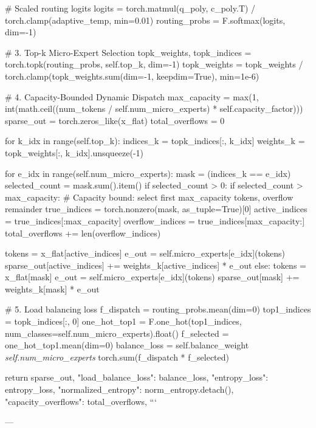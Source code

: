 \documentclass[11pt,twoside,openright]{amsbook}
\begin{document}
{{{{{{{{{{    # Scaled routing logits
    logits = torch.matmul(q_poly, c_poly.T) / torch.clamp(adaptive_temp, min=0.01)
    routing_probs = F.softmax(logits, dim=-1)

    # 3. Top-k Micro-Expert Selection
    topk_weights, topk_indices = torch.topk(routing_probs, self.top_k, dim=-1)
    topk_weights = topk_weights / torch.clamp(topk_weights.sum(dim=-1, keepdim=True), min=1e-6)

    # 4. Capacity-Bounded Dynamic Dispatch
    max_capacity = max(1, int(math.ceil((num_tokens / self.num_micro_experts) * self.capacity_factor)))
    sparse_out = torch.zeros_like(x_flat)
    total_overflows = 0

    for k_idx in range(self.top_k):
        indices_k = topk_indices[:, k_idx]
        weights_k = topk_weights[:, k_idx].unsqueeze(-1)

        for e_idx in range(self.num_micro_experts):
            mask = (indices_k == e_idx)
            selected_count = mask.sum().item()
            if selected_count > 0:
                if selected_count > max_capacity:
                    # Capacity bound: select first max_capacity tokens, overflow remainder
                    true_indices = torch.nonzero(mask, as_tuple=True)[0]
                    active_indices = true_indices[:max_capacity]
                    overflow_indices = true_indices[max_capacity:]
                    total_overflows += len(overflow_indices)
                    
                    tokens = x_flat[active_indices]
                    e_out = self.micro_experts[e_idx](tokens)
                    sparse_out[active_indices] += weights_k[active_indices] * e_out
                else:
                    tokens = x_flat[mask]
                    e_out = self.micro_experts[e_idx](tokens)
                    sparse_out[mask] += weights_k[mask] * e_out

    # 5. Load balancing loss
    f_dispatch = routing_probs.mean(dim=0)
    top1_indices = topk_indices[:, 0]
    one_hot_top1 = F.one_hot(top1_indices, num_classes=self.num_micro_experts).float()
    f_selected = one_hot_top1.mean(dim=0)
    balance_loss = self.balance_weight \textit{ self.num_micro_experts } torch.sum(f_dispatch * f_selected)

    return sparse_out, {
        "load_balance_loss": balance_loss,
        "entropy_loss": entropy_loss,
        "normalized_entropy": norm_entropy.detach(),
        "capacity_overflows": total_overflows,
    }
```

---

}}}}}}}}}}
\end{document}
